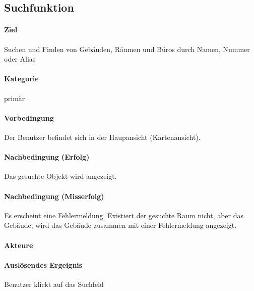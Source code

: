 \subsection{Suchfunktion}
\label{Suchfunktion}
\paragraph{Ziel}
Suchen und Finden von Gebäuden, Räumen und Büros durch Namen, Nummer oder Alias
\paragraph{Kategorie}
primär
\paragraph{Vorbedingung}
Der Benutzer befindet sich in der Haupansicht (Kartenansicht).
\paragraph{Nachbedingung (Erfolg)}
Das gesuchte Objekt wird angezeigt.
\paragraph{Nachbedingung (Misserfolg)}
Es erscheint eine Fehlermeldung. Existiert der gesuchte Raum nicht, aber das Gebäude, wird das Gebäude zusammen mit einer Fehlermeldung angezeigt.
\paragraph{Akteure}

\paragraph{Auslösendes Ergeignis}
Benutzer klickt auf das Suchfeld
